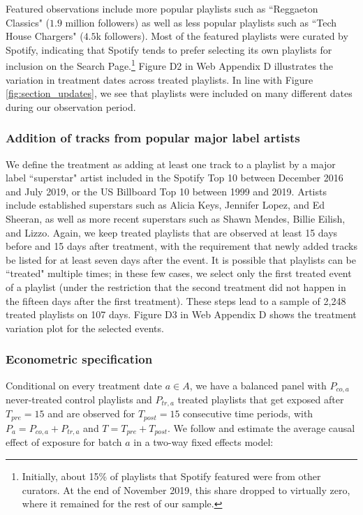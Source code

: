 \documentclass[12pt, a4paper, leqno]{article}
\begin{document}
Featured observations include more popular playlists such as ``Reggaeton Classics" ($1.9$ million followers) as well as less popular playlists such as  ``Tech House Chargers" ($4.5$k followers). Most of the featured playlists were curated by Spotify, indicating that Spotify tends to prefer selecting its own playlists for inclusion on the Search Page.\footnote{Initially, about 15\% of playlists that Spotify featured were from other curators. At the end of November 2019, this share dropped to virtually zero, where it remained for the rest of our sample.} Figure D2 in Web Appendix D illustrates the variation in treatment dates across treated playlists. In line with Figure \ref{fig:section_updates}, we see that playlists were included on many different dates during our observation period.

\subsubsection{Addition of tracks from popular major label artists}
We define the treatment as adding at least one track to a playlist by a major label ``superstar" artist included in the Spotify Top 10 between December 2016 and July 2019, or the US Billboard Top 10 between 1999 and
2019. Artists include established superstars such as Alicia Keys, Jennifer Lopez, and Ed Sheeran, as well as more recent superstars such as Shawn Mendes, Billie Eilish, and Lizzo. Again, we keep treated playlists that are observed at least 15 days before and 15 days after treatment, with the requirement that newly added tracks be listed for at least seven days after the event. It is possible that playlists can be ``treated" multiple times; in these few cases, we select only the first treated event of a playlist (under the restriction that the second treatment did not happen in the fifteen days after the first treatment). These steps lead to a sample of 2,248 treated playlists on 107 days. Figure D3 in Web Appendix D shows the treatment variation plot for the selected events.

\subsubsection{Econometric specification}
Conditional on every treatment date $a \in A$, we have a balanced panel with $P_{co,a}$ never-treated control playlists and $P_{tr,a}$ treated playlists that get exposed after $T_{pre} = 15$ and are observed for $T_{post} = 15$ consecutive time periods, with $P_a=P_{co,a}+P_{tr,a}$ and $T=T_{pre}+T_{post}$. We follow \cite{SDiD_AER_Arkhangelsky_21} and estimate the average causal effect of exposure for batch $a$ in a two-way fixed effects model:
\end{document}
